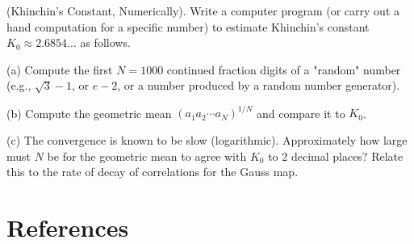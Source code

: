 \begin{exercise}
(Khinchin's Constant, Numerically). Write a computer program (or carry out a hand computation for a specific number) to estimate Khinchin's constant $K_0 \approx 2.6854\ldots$ as follows.

(a) Compute the first $N = 1000$ continued fraction digits of a "random" number (e.g., $\sqrt{3} - 1$, or $e - 2$, or a number produced by a random number generator).

(b) Compute the geometric mean $(a_1 a_2 \cdots a_N)^{1/N}$ and compare it to $K_0$.

(c) The convergence is known to be slow (logarithmic). Approximately how large must $N$ be for the geometric mean to agree with $K_0$ to 2 decimal places? Relate this to the rate of decay of correlations for the Gauss map.
\end{exercise}


\section*{References}

